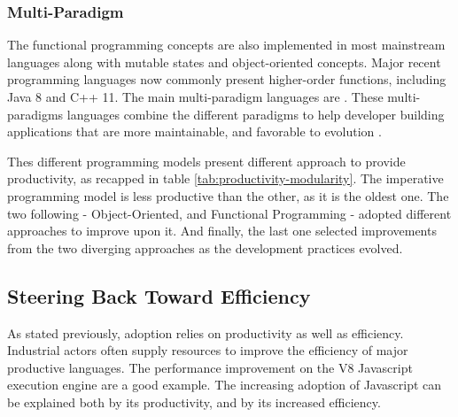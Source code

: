 \subsubsection{Multi-Paradigm}

The functional programming concepts are also implemented in most mainstream languages along with mutable states and object-oriented concepts.
Major recent programming languages now commonly present higher-order functions, including Java 8 and C++ 11.
The main multi-paradigm languages are .
These multi-paradigms languages combine the different paradigms to help developer building applications that are more maintainable, and favorable to evolution \cite{Hughes1989,Turner1981}.

\separator

Thes different programming models present different approach to provide productivity, as recapped in table \ref{tab:productivity-modularity}.
The imperative programming model is less productive than the other, as it is the oldest one.
The two following - Object-Oriented, and Functional Programming - adopted different approaches to improve upon it.
And finally, the last one selected improvements from the two diverging approaches as the development practices evolved.


\subsection{Steering Back Toward Efficiency} \label{chapter3:software-productivity:adoption}

\begin{figure}
%
\end{figure}


As stated previously, adoption relies on productivity as well as efficiency.
Industrial actors often supply resources to improve the efficiency of major productive languages.
The performance improvement on the V8 Javascript execution engine are a good example.
The increasing adoption of Javascript can be explained both by its productivity, and by its increased efficiency.

